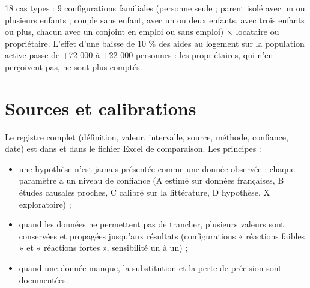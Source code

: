 18 cas types : 9 configurations familiales (personne seule ; parent isolé avec un ou plusieurs enfants ; couple sans
enfant, avec un ou deux enfants, avec trois enfants ou plus, chacun avec un conjoint en emploi ou sans emploi) ×
locataire ou propriétaire. L'effet d'une baisse de 10 \% des aides au logement sur la population active passe de
+72 000 à +22 000 personnes : les propriétaires, qui n'en perçoivent pas, ne sont plus comptés.

\chapter{Sources et calibrations}\label{ch:sources}

Le registre complet (définition, valeur, intervalle, source, méthode, confiance, date) est dans
 et dans le fichier Excel de comparaison. Les principes :
\begin{itemize}
\item une hypothèse n'est jamais présentée comme une donnée observée : chaque paramètre a un niveau de confiance
(A estimé sur données françaises, B études causales proches, C calibré sur la littérature, D hypothèse, X
exploratoire) ;
\item quand les données ne permettent pas de trancher, plusieurs valeurs sont conservées et propagées jusqu'aux
résultats (configurations « réactions faibles » et « réactions fortes », sensibilité un à un) ;
\item quand une donnée manque, la substitution et la perte de précision sont documentées.
\end{itemize}

